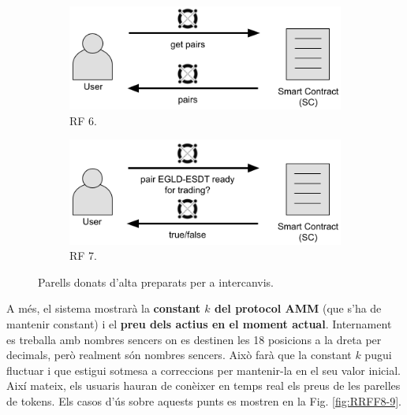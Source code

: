 \documentclass[11pt,a4paper]{article}
\begin{document}
\begin{figure}[!htb]
\begin{subfigure}[b]{0.49\textwidth}
  \includegraphics[width=\linewidth]{cu_get_pairs.png}
  \caption{RF 6.}\label{fig:statuspair}
\end{subfigure}\hfill
\begin{subfigure}[b]{0.49\textwidth}
  \includegraphics[width=\linewidth]{cu_status_pair.png}
  \caption{RF 7.}\label{fig:statuspair}
\end{subfigure}\hfill
\caption{Parells donats d'alta preparats per a intercanvis.}
\end{figure}

A més, el sistema mostrarà la \textbf{constant \(k\) del protocol AMM} (que s'ha de mantenir constant) i el \textbf{preu dels actius en el moment actual}. Internament es treballa amb nombres sencers on es destinen les 18 posicions a la dreta per decimals, però realment són nombres sencers. Això farà que la constant \(k\) pugui fluctuar i que estigui sotmesa a correccions per mantenir-la en el seu valor inicial. Així mateix, els usuaris hauran de conèixer en temps real els preus de les parelles de tokens. Els casos d'ús sobre aquests punts es mostren en la Fig. \ref{fig:RRFF8-9}.
\end{document}
